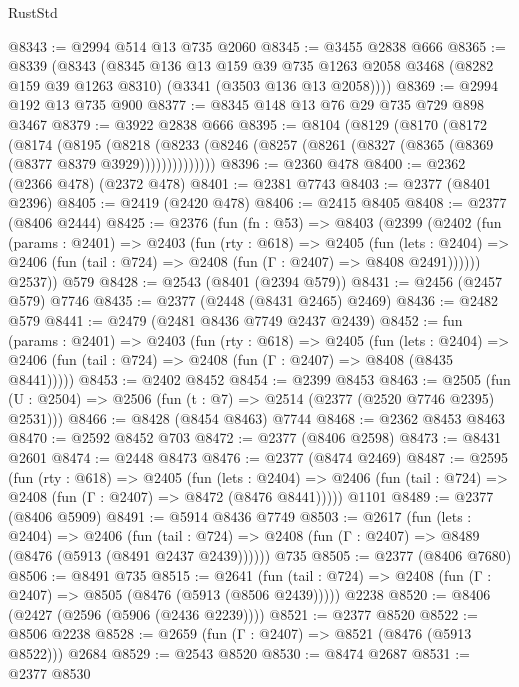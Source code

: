 \begin{lexlean}{RustStd}
\begin{coremodule}
@8343 := @2994 @514 @13 @735 @2060
@8345 := @3455 @2838 @666
@8365 := @8339
    (@8343
      (@8345
        @136
        @13
        @159
        @39
        @735
        @1263
        @2058
        @3468
        (@8282 @159 @39 @1263 @8310)
        (@3341 (@3503 @136 @13 @2058))))
@8369 := @2994 @192 @13 @735 @900
@8377 := @8345 @148 @13 @76 @29 @735 @729 @898 @3467
@8379 := @3922 @2838 @666
@8395 := @8104
    (@8129
      (@8170
        (@8172
          (@8174
            (@8195
              (@8218
                (@8233 (@8246 (@8257 (@8261 (@8327 (@8365 (@8369 (@8377 @8379 @3929))))))))))))))
@8396 := @2360 @478
@8400 := @2362 (@2366 @478) (@2372 @478)
@8401 := @2381 @7743
@8403 := @2377 (@8401 @2396)
@8405 := @2419 (@2420 @478)
@8406 := @2415 @8405
@8408 := @2377 (@8406 @2444)
@8425 := @2376
    (fun (fn : @53) =>
    @8403
      (@2399
        (@2402
          (fun (params : @2401) =>
          @2403
            (fun (rty : @618) =>
            @2405
              (fun (lets : @2404) =>
              @2406 (fun (tail : @724) => @2408 (fun (Γ : @2407) => @8408 @2491))))))
        @2537))
    @579
@8428 := @2543 (@8401 (@2394 @579))
@8431 := @2456 (@2457 @579) @7746
@8435 := @2377 (@2448 (@8431 @2465) @2469)
@8436 := @2482 @579
@8441 := @2479 (@2481 @8436 @7749 @2437 @2439)
@8452 := fun (params : @2401) =>
  @2403
    (fun (rty : @618) =>
    @2405
      (fun (lets : @2404) =>
      @2406 (fun (tail : @724) => @2408 (fun (Γ : @2407) => @8408 (@8435 @8441)))))
@8453 := @2402 @8452
@8454 := @2399 @8453
@8463 := @2505 (fun (U : @2504) => @2506 (fun (t : @7) => @2514 (@2377 (@2520 @7746 @2395) @2531)))
@8466 := @8428 (@8454 @8463) @7744
@8468 := @2362 @8453 @8463
@8470 := @2592 @8452 @703
@8472 := @2377 (@8406 @2598)
@8473 := @8431 @2601
@8474 := @2448 @8473
@8476 := @2377 (@8474 @2469)
@8487 := @2595
    (fun (rty : @618) =>
    @2405
      (fun (lets : @2404) =>
      @2406 (fun (tail : @724) => @2408 (fun (Γ : @2407) => @8472 (@8476 @8441)))))
    @1101
@8489 := @2377 (@8406 @5909)
@8491 := @5914 @8436 @7749
@8503 := @2617
    (fun (lets : @2404) =>
    @2406
      (fun (tail : @724) => @2408 (fun (Γ : @2407) => @8489 (@8476 (@5913 (@8491 @2437 @2439))))))
    @735
@8505 := @2377 (@8406 @7680)
@8506 := @8491 @735
@8515 := @2641
    (fun (tail : @724) => @2408 (fun (Γ : @2407) => @8505 (@8476 (@5913 (@8506 @2439)))))
    @2238
@8520 := @8406 (@2427 (@2596 (@5906 (@2436 @2239))))
@8521 := @2377 @8520
@8522 := @8506 @2238
@8528 := @2659 (fun (Γ : @2407) => @8521 (@8476 (@5913 @8522))) @2684
@8529 := @2543 @8520
@8530 := @8474 @2687
@8531 := @2377 @8530

\end{coremodule}
\end{lexlean}
